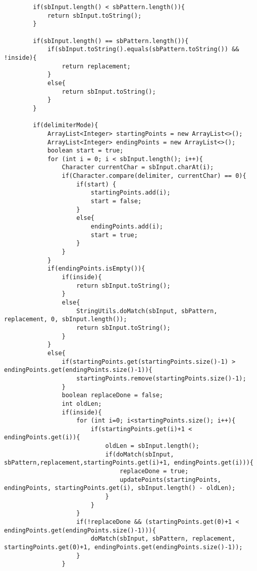 \documentclass{article}
\begin{document}
\begin{lstlisting}
        if(sbInput.length() < sbPattern.length()){
            return sbInput.toString();
        }

        if(sbInput.length() == sbPattern.length()){
            if(sbInput.toString().equals(sbPattern.toString()) && !inside){
                return replacement;
            }
            else{
                return sbInput.toString();
            }
        }

        if(delimiterMode){
            ArrayList<Integer> startingPoints = new ArrayList<>();
            ArrayList<Integer> endingPoints = new ArrayList<>();
            boolean start = true;
            for (int i = 0; i < sbInput.length(); i++){
                Character currentChar = sbInput.charAt(i);
                if(Character.compare(delimiter, currentChar) == 0){
                    if(start) {
                        startingPoints.add(i);
                        start = false;
                    }
                    else{
                        endingPoints.add(i);
                        start = true;
                    }
                }
            }
            if(endingPoints.isEmpty()){
                if(inside){
                    return sbInput.toString();
                }
                else{
                    StringUtils.doMatch(sbInput, sbPattern, replacement, 0, sbInput.length());
                    return sbInput.toString();
                }
            }
            else{
                if(startingPoints.get(startingPoints.size()-1) > endingPoints.get(endingPoints.size()-1)){
                    startingPoints.remove(startingPoints.size()-1);
                }
                boolean replaceDone = false;
                int oldLen;
                if(inside){
                    for (int i=0; i<startingPoints.size(); i++){
                        if(startingPoints.get(i)+1 < endingPoints.get(i)){
                            oldLen = sbInput.length();
                            if(doMatch(sbInput, sbPattern,replacement,startingPoints.get(i)+1, endingPoints.get(i))){
                                replaceDone = true;
                                updatePoints(startingPoints, endingPoints, startingPoints.get(i), sbInput.length() - oldLen);
                            }
                        }
                    }
                    if(!replaceDone && (startingPoints.get(0)+1 < endingPoints.get(endingPoints.size()-1))){
                        doMatch(sbInput, sbPattern, replacement, startingPoints.get(0)+1, endingPoints.get(endingPoints.size()-1));
                    }
                }

\end{lstlisting}
\end{document}
